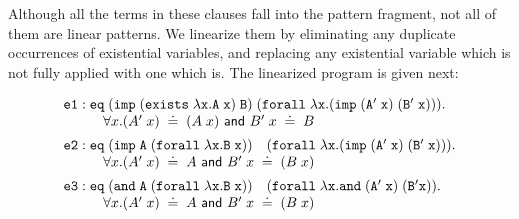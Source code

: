 \documentclass{llncs}
\newcommand{\typeLF}{\tt{type}}
\newcommand{\propLF}{\tt{prop}}
\newcommand{\andLF}{\tt{and}\;}
\newcommand{\impLF}{\tt{imp}\;}
\newcommand{\forallLF}{\tt{forall}\;}
\newcommand{\existsLF}{\tt{exists}\;}
\newcommand{\eqLF}{\tt{eq}\;}
\newcommand{\eqilLF}{\tt{e1}}
\newcommand{\eqirLF}{\tt{e2}}
\newcommand{\eqalLF}{\tt{e3}}
\newcommand{\eqarLF}{\tt{e4}}
\newcommand{\unif}{\;\doteq\;}
\begin{document}
Although all the terms in these clauses fall
into the pattern fragment, not all of them are linear patterns.
%
We linearize them by eliminating any duplicate
occurrences of existential variables, and replacing any existential
variable which is not fully applied with one which is. The linearized
program  is given next:


\begin{small}
\[
\begin{array}{ll}
%
\eqilLF: \eqLF (\impLF (\existsLF \lambda x. A\; x)\; B)\;
                 (\forallLF \lambda x. (\impLF (A'\; x)\; (B'\;x))). \\
\hspace{1cm}\forall x. (A'\; x) \unif (A \; x) {\textsf{ and } } B'\;x   \unif B\\[0.5em]
\eqirLF: \eqLF (\impLF A\; (\forallLF \lambda x. B\;x))\quad
                 (\forallLF \lambda x. (\impLF (A'\;x) \; (B'\; x))).\\
\hspace{1cm} \forall x. (A'\; x) \unif A  {\textsf{ and }} B'\;x   \unif (B\;x)\\[0.5em]
\eqalLF: \eqLF (\andLF A \; (\forallLF \lambda x. B\; x)) \quad
                 (\forallLF \lambda x. \andLF (A'\;x) \; (B' x)).\\
\hspace{1cm} \forall x. (A'\; x) \unif A  {\textsf{ and }} B'\;x   \unif (B\;x)\\[0.5em]
\end{array}
\]
\end{small}
\end{document}
